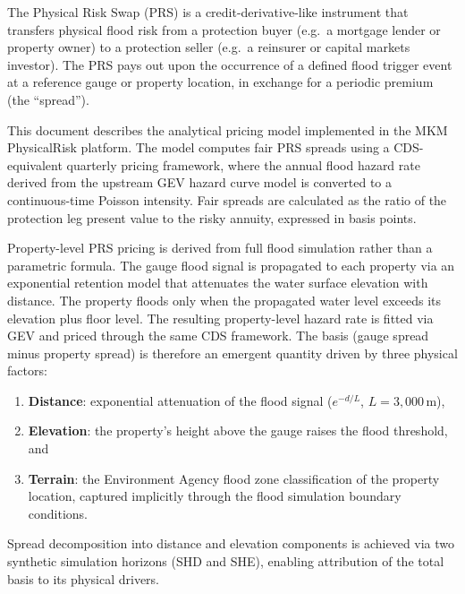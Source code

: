 \documentclass[11pt,a4paper]{article}
\begin{document}
\mkmtitlepage
\mkmlegalpage
\tableofcontents
\clearpage

\mkmexecsummary

The Physical Risk Swap (PRS) is a credit-derivative-like instrument that transfers
physical flood risk from a protection buyer (e.g.\ a mortgage lender or property owner)
to a protection seller (e.g.\ a reinsurer or capital markets investor). The PRS pays out
upon the occurrence of a defined flood trigger event at a reference gauge or property
location, in exchange for a periodic premium (the ``spread'').

This document describes the analytical pricing model implemented in the MKM PhysicalRisk
platform. The model computes fair PRS spreads using a CDS-equivalent quarterly pricing
framework, where the annual flood hazard rate derived from the upstream GEV hazard curve
model is converted to a continuous-time Poisson intensity. Fair spreads are calculated as
the ratio of the protection leg present value to the risky annuity, expressed in basis
points.

Property-level PRS pricing is derived from full flood simulation rather than a
parametric formula. The gauge flood signal is propagated to each property via an
exponential retention model that attenuates the water surface elevation with distance.
The property floods only when the propagated water level exceeds its elevation plus
floor level. The resulting property-level hazard rate is fitted via GEV and priced
through the same CDS framework. The basis (gauge spread minus property spread) is
therefore an emergent quantity driven by three physical factors:

\begin{enumerate}[nosep]
    \item \textbf{Distance}: exponential attenuation of the flood signal ($e^{-d/L}$,
          $L = 3{,}000$\,m),
    \item \textbf{Elevation}: the property's height above the gauge raises the flood
          threshold, and
    \item \textbf{Terrain}: the Environment Agency flood zone classification of the
          property location, captured implicitly through the flood simulation boundary
          conditions.
\end{enumerate}

Spread decomposition into distance and elevation components is achieved via two
synthetic simulation horizons (SHD and SHE), enabling attribution of the total basis
to its physical drivers.
\end{document}

